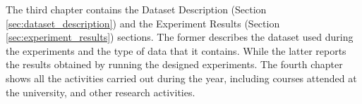 \newline The third chapter contains the Dataset Description (Section \ref{sec:dataset_description}) and the Experiment Results (Section \ref{sec:experiment_results}) sections. The former describes the dataset used during the experiments and the type of data that it contains. While the latter reports the results obtained by running the designed experiments.
\newline The fourth chapter shows all the activities carried out during the year, including courses attended at the university, and other research activities.
